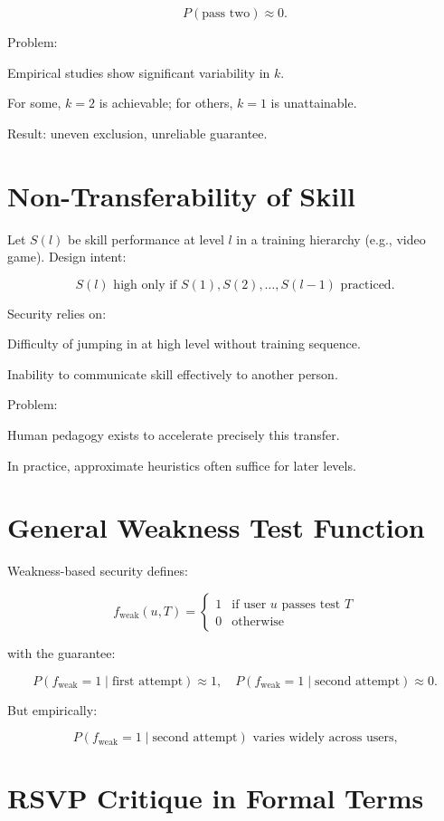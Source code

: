 \documentclass{book}
\begin{document}
\[ P(\text{pass two}) \approx 0. \]

Problem:

Empirical studies \cite{eriksen1985, mccormick1990} show significant variability in \( k \).

For some, \( k=2 \) is achievable; for others, \( k=1 \) is unattainable.

Result: uneven exclusion, unreliable guarantee.

\section{Non-Transferability of Skill}

Let \( S(l) \) be skill performance at level \( l \) in a training hierarchy (e.g., video game). Design intent:

\[ S(l) \text{ high only if } S(1), S(2), \dots, S(l-1) \text{ practiced.} \]

Security relies on:

Difficulty of jumping in at high level without training sequence.

Inability to communicate skill effectively to another person.

Problem:

Human pedagogy exists to accelerate precisely this transfer.

In practice, approximate heuristics often suffice for later levels.

\section{General Weakness Test Function}

Weakness-based security defines:

\[ f_{\text{weak}}(u, T) =
\begin{cases}
1 & \text{if user } u \text{ passes test } T \\
0 & \text{otherwise}
\end{cases} \]

with the guarantee:

\[ P(f_{\text{weak}}=1 \mid \text{first attempt}) \approx 1, \quad
P(f_{\text{weak}}=1 \mid \text{second attempt}) \approx 0. \]

But empirically:

\[ P(f_{\text{weak}}=1 \mid \text{second attempt}) \text{ varies widely across users,} \]

\section{RSVP Critique in Formal Terms}
\end{document}
